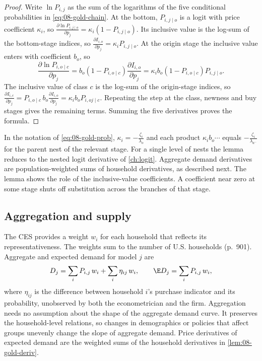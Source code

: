 \begin{proof}
Write $\ln P_{i,j}$ as the sum of the logarithms of the five conditional probabilities in
\cref{eq:08-gold-chain}. At the bottom, $P_{i,j\mid o}$ is a logit with price coefficient $\kappa_i$, so
$\frac{\partial \ln P_{i,j\mid o}}{\partial p_j} = \kappa_i(1 - P_{i,j\mid o})$. Its inclusive value is the
log-sum of the bottom-stage indices, so $\frac{\partial I_{i,o}}{\partial p_j} = \kappa_i P_{i,j\mid o}$. At
the origin stage the inclusive value enters with coefficient $b_o$, so
\[
\frac{\partial \ln P_{i,o\mid c}}{\partial p_j} = b_o (1 - P_{i,o\mid c})\frac{\partial I_{i,o}}{\partial p_j}
= \kappa_i b_o (1 - P_{i,o\mid c}) P_{i,j\mid o}.
\]
The inclusive value of class $c$ is the log-sum of the origin-stage indices, so
$\frac{\partial I_{i,c}}{\partial p_j} = P_{i,o\mid c}\, b_o \frac{\partial I_{i,o}}{\partial p_j} =
\kappa_i b_o P_{i,oj\mid c}$. Repeating the step at the class, newness and buy stages gives the remaining
terms. Summing the five derivatives proves the formula.
\end{proof}

In the notation of \cref{eq:08-gold-prob}, $\kappa_i = -\frac{\zeta_i}{\lambda_o}$ and each product $\kappa_i
b_o \cdots$ equals $-\frac{\zeta_i}{\lambda_{a^-}}$ for the parent nest of the relevant stage. For a single
level of nests the lemma reduces to the nested logit derivative of \cref{ch:logit}. Aggregate demand derivatives
are population-weighted sums of household derivatives, as described next. The lemma shows the role of the
inclusive-value coefficients. A coefficient near zero at some stage shuts off substitution across the branches
of that stage.

\subsection{Aggregation and supply}\label{sec:08-goldberg-supply}

 The CES provides a weight $w_i$ for each household that reflects its
representativeness. The weights sum to the number of U.S. households (p.~901). Aggregate and expected demand for
model $j$ are
\begin{equation}\label{eq:08-gold-agg}
D_j = \sum_i P_{i,j}\,w_i + \sum_i \eta_{ij}\,w_i,
\qquad
\E D_j = \sum_i P_{i,j}\,w_i ,
\end{equation}
where $\eta_{ij}$ is the difference between household $i$'s purchase indicator and its probability, unobserved
by both the econometrician and the firm. Aggregation needs no assumption about the shape of the aggregate
demand curve. It preserves the household-level relations, so changes in demographics or policies that affect
groups unevenly change the slope of aggregate demand. Price derivatives of expected demand are the weighted sums
of the household derivatives in \cref{lem:08-gold-deriv}.

